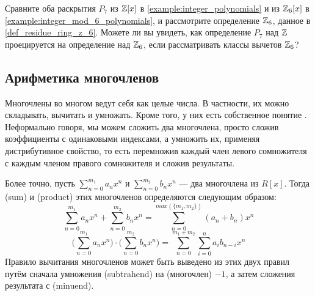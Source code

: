 \begin{exercise}
Сравните оба раскрытия $P_7$ из $\mathbb{Z}[x]$ в \examplename{} \ref{example:integer_polynomials} и из $\mathbb{Z}_6[x]$ в \examplename{} \ref{example:integer_mod_6_polynomials}, и рассмотрите определение $\mathbb{Z}_6$, данное в \examplename{} \ref{def_residue_ring_z_6}. Можете ли вы увидеть, как определение $P_7$ над $\mathbb{Z}$ проецируется на определение над $\mathbb{Z}_6$, если рассматривать классы вычетов $\mathbb{Z}_6$?
\end{exercise}
\subsection{Арифметика многочленов}
Многочлены во многом ведут себя как целые числа. В частности, их можно складывать, вычитать и умножать. Кроме того, у них есть собственное понятие . Неформально говоря, мы можем сложить два многочлена, просто сложив коэффициенты с одинаковыми индексами, а умножить их, применяя дистрибутивное свойство, то есть перемножив каждый член левого сомножителя с каждым членом правого сомножителя и сложив результаты.

Более точно, пусть $ \sum _{n = 0} ^{m_1}{a} _{n}{x} ^{n} $ и
$ \sum _{n = 0} ^{m_2}{b} _{n}{x^n} $ — два многочлена из $ R[x]$. Тогда  (sum) и  (product) этих многочленов определяются следующим образом:
\begin{equation}
\label{def:polynomial_arithmetic}
\sum _{n = 0} ^{m_1}{a} _{n}{x} ^{n} + \sum _{n = 0} ^{m_2}{b} _{n}{x } ^{n} = \sum _{n = 0} ^{max(\{m_1,m_2\})}{({a} _{n} +{b} _{n})}{x} ^{n}
\end{equation}
\begin{equation}
\label{def:polynomial_arithmetic_mul}
\bigg (\sum _{n = 0} ^{m_1}{a} _{n}{x} ^{n} \bigg) \cdot \bigg (\sum _{n = 0} ^{m_2 }{b} _{n}{x} ^{n} \bigg) = \sum _{n = 0} ^{m_1+m_2} \sum_{i = 0} ^{n}{a} _{i }{{b} _{n-i}}{x} ^{n}
\end{equation}
Правило вычитания многочленов может быть выведено из этих двух правил путём сначала умножения  (subtrahend) на (многочлен) $-1$, а затем сложения результата с  (minuend).

